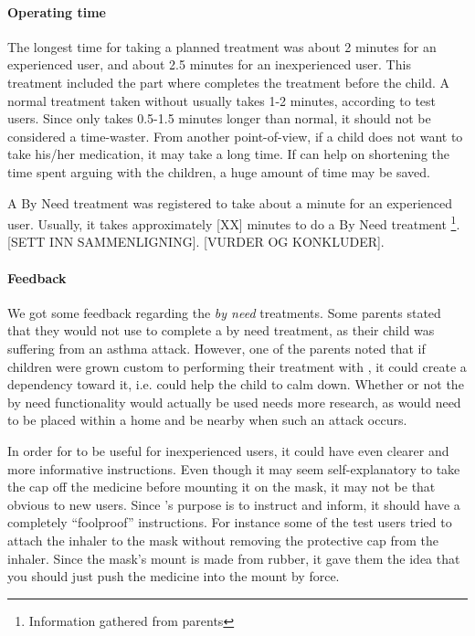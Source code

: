 \paragraph{Operating time}
The longest time for taking a planned treatment was about 2 minutes for an experienced user, and about 2.5 minutes for an inexperienced user. This treatment included the part where \buddy{} completes the treatment before the child. A normal treatment taken without \ab{} usually takes 1-2 minutes, according to test users. Since \ab{} only takes 0.5-1.5 minutes longer than normal, it should not be considered a time-waster. From another point-of-view, if a child does not want to take his/her medication, it may take a long time. If \ab{} can help on shortening the time spent arguing with the children, a huge amount of time may be saved.      

A By Need treatment was registered to take about a minute for an experienced user. Usually, it takes approximately [XX] minutes to do a By Need treatment \footnote{Information gathered from parents}. [SETT INN SAMMENLIGNING]. [VURDER OG KONKLUDER].  


\paragraph{Feedback}
We got some feedback regarding the \emph{by need} treatments. Some parents stated that they would not use \buddy{} to complete a by need treatment, as their child was suffering from an asthma attack. However, one of the parents noted that if children were grown custom to performing their treatment with \buddy{}, it could create a dependency toward it, i.e. \buddy{} could help the child to calm down. Whether or not the by need functionality would actually be used needs more research, as \buddy{} would need to be placed within a home and be nearby when such an attack occurs. 

In order for \ab{} to be useful for inexperienced users, it could have even clearer and more informative instructions. Even though it may seem self-explanatory to take the cap off the medicine before mounting it on the mask, it may not be that obvious to new users. Since \ab{}'s purpose is to instruct and inform, it should have a completely ``foolproof'' instructions. For instance some of the test users tried to attach the inhaler to the mask without removing the protective cap from the inhaler. Since the mask's mount is made from rubber, it gave them the idea that you should just push the medicine into the mount by force. 


